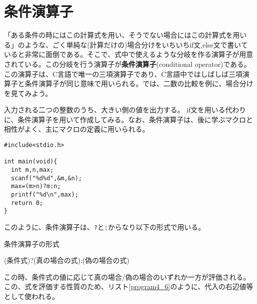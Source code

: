 \section{条件演算子}
「ある条件の時にはこの計算式を用い、そうでない場合にはこの計算式を用いる」のような、ごく単純な(計算だけの)場合分けをいちいちif文,else文で書いていると非常に面倒である。そこで、式中で使えるような分岐を作る演算子が用意されている。この分岐を行う演算子が\textbf{条件演算子}(conditional operator)である。この演算子は、C言語で唯一の三項演算子であり、C言語中ではしばしば三項演算子と条件演算子が同じ意味で用いられる。では、二数の比較を例に、場合分けを見てみよう。
\begin{boxnote}
\begin{multicols}{2}
入力される二つの整数のうち、大きい側の値を出力する。
if文を用いる代わりに、条件演算子を用いて作成してみる。なお、条件演算子は、後に学ぶマクロと相性がよく、主にマクロの定義に用いられる。
\begin{lstlisting}[caption=二数の比較,label=program4_6]
#include<stdio.h>

int main(void){
  int m,n,max;
  scanf("%d%d",&m,&n);
  max=(m>n)?m:n;
  printf("%d\n",max);
  return 0;
}
\end{lstlisting}
\end{multicols}
\end{boxnote}

このように、条件演算子は、\verb|?|と\verb|:|からなり以下の形式で用いる。
\begin{itembox}[l]{条件演算子の形式}
\begin{code}
(条件式)?(真の場合の式):(偽の場合の式)
\end{code}
\end{itembox}
この時、条件式の値に応じて真の場合/偽の場合のいずれか一方が評価される。この、式を評価する性質のため、リスト\ref{program4_6}のように、代入の右辺値等として使われる。

